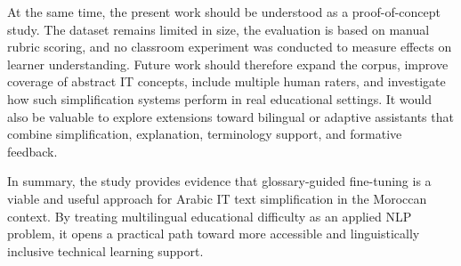 \documentclass[education,article,submit,moreauthors]{Definitions/mdpi}
\begin{document}
At the same time, the present work should be understood as a proof-of-concept study. The dataset remains limited in size, the evaluation is based on manual rubric scoring, and no classroom experiment was conducted to measure effects on learner understanding. Future work should therefore expand the corpus, improve coverage of abstract IT concepts, include multiple human raters, and investigate how such simplification systems perform in real educational settings. It would also be valuable to explore extensions toward bilingual or adaptive assistants that combine simplification, explanation, terminology support, and formative feedback.

In summary, the study provides evidence that glossary-guided fine-tuning is a viable and useful approach for Arabic IT text simplification in the Moroccan context. By treating multilingual educational difficulty as an applied NLP problem, it opens a practical path toward more accessible and linguistically inclusive technical learning support.






\acknowledgments{}





\PublishersNote{}
\end{document}
